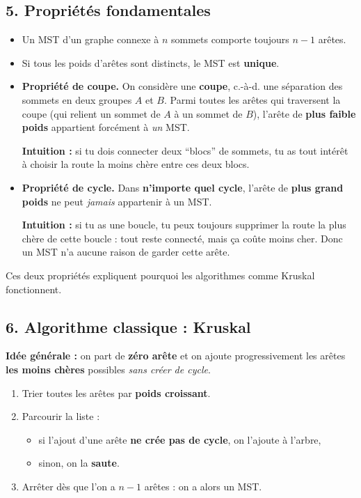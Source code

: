 \subsection*{5. Propriétés fondamentales}

\begin{itemize}
    \item Un MST d’un graphe connexe à \( n \) sommets comporte toujours \( n-1 \) arêtes.
    
    \item Si tous les poids d’arêtes sont distincts, le MST est \textbf{unique}.
    
    \item \textbf{Propriété de coupe.}  
    On considère une \textbf{coupe}, c.-à-d. une séparation des sommets en deux groupes \( A \) et \( B \).  
    Parmi toutes les arêtes qui traversent la coupe (qui relient un sommet de \( A \) à un sommet de \( B \)), 
    l’arête de \textbf{plus faible poids} appartient forcément à \emph{un} MST.
    
    \textbf{Intuition :} si tu dois connecter deux “blocs” de sommets, tu as tout intérêt à choisir la route la moins chère entre ces deux blocs.
    
    \item \textbf{Propriété de cycle.}  
    Dans \textbf{n’importe quel cycle}, l’arête de \textbf{plus grand poids} ne peut \emph{jamais} appartenir à un MST.
    
    \textbf{Intuition :} si tu as une boucle, tu peux toujours supprimer la route la plus chère de cette boucle : 
    tout reste connecté, mais ça coûte moins cher. Donc un MST n’a aucune raison de garder cette arête.
\end{itemize}

Ces deux propriétés expliquent pourquoi les algorithmes comme Kruskal fonctionnent.

\subsection*{6. Algorithme classique : Kruskal}

\textbf{Idée générale :} on part de \textbf{zéro arête} et on ajoute progressivement les arêtes \textbf{les moins chères} possibles \emph{sans créer de cycle}. \\

\begin{enumerate}
    \item Trier toutes les arêtes par \textbf{poids croissant}.
    \item Parcourir la liste :
    \begin{itemize}
        \item si l’ajout d’une arête \textbf{ne crée pas de cycle}, on l’ajoute à l’arbre,
        \item sinon, on la \textbf{saute}.
    \end{itemize}
    \item Arrêter dès que l’on a \( n-1 \) arêtes : on a alors un MST. \\
\end{enumerate}

